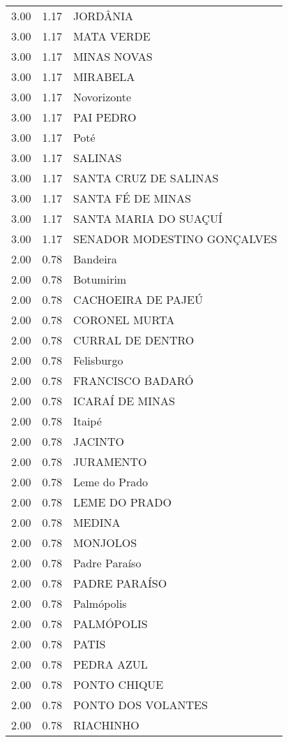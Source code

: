 \documentclass[a4paper, 12pt, openright, oneside, english, brazil, article]{abntex2}
\begin{document}
\begin{scriptsize}
\begin{longtable}{rrl}
		3.00 & 1.17 & JORDÂNIA \\ 
		3.00 & 1.17 & MATA VERDE \\ 
		3.00 & 1.17 & MINAS NOVAS \\ 
		3.00 & 1.17 & MIRABELA \\ 
		3.00 & 1.17 & Novorizonte \\ 
		3.00 & 1.17 & PAI PEDRO \\ 
		3.00 & 1.17 & Poté \\ 
		3.00 & 1.17 & SALINAS \\ 
		3.00 & 1.17 & SANTA CRUZ DE SALINAS \\ 
		3.00 & 1.17 & SANTA FÉ DE MINAS \\ 
		3.00 & 1.17 & SANTA MARIA DO SUAÇUÍ \\ 
		3.00 & 1.17 & SENADOR MODESTINO GONÇALVES \\ 
		2.00 & 0.78 & Bandeira \\ 
		2.00 & 0.78 & Botumirim \\ 
		2.00 & 0.78 & CACHOEIRA DE PAJEÚ \\ 
		2.00 & 0.78 & CORONEL MURTA \\ 
		2.00 & 0.78 & CURRAL DE DENTRO \\ 
		2.00 & 0.78 & Felisburgo \\ 
		2.00 & 0.78 & FRANCISCO BADARÓ \\ 
		2.00 & 0.78 & ICARAÍ DE MINAS \\ 
		2.00 & 0.78 & Itaipé \\ 
		2.00 & 0.78 & JACINTO \\ 
		2.00 & 0.78 & JURAMENTO \\ 
		2.00 & 0.78 & Leme do Prado \\ 
		2.00 & 0.78 & LEME DO PRADO \\ 
		2.00 & 0.78 & MEDINA \\ 
		2.00 & 0.78 & MONJOLOS \\ 
		2.00 & 0.78 & Padre Paraíso \\ 
		2.00 & 0.78 & PADRE PARAÍSO \\ 
		2.00 & 0.78 & Palmópolis \\ 
		2.00 & 0.78 & PALMÓPOLIS \\ 
		2.00 & 0.78 & PATIS \\ 
		2.00 & 0.78 & PEDRA AZUL \\ 
		2.00 & 0.78 & PONTO CHIQUE \\ 
		2.00 & 0.78 & PONTO DOS VOLANTES \\ 
		2.00 & 0.78 & RIACHINHO \\ 

\end{longtable}
\end{scriptsize}
\end{document}
